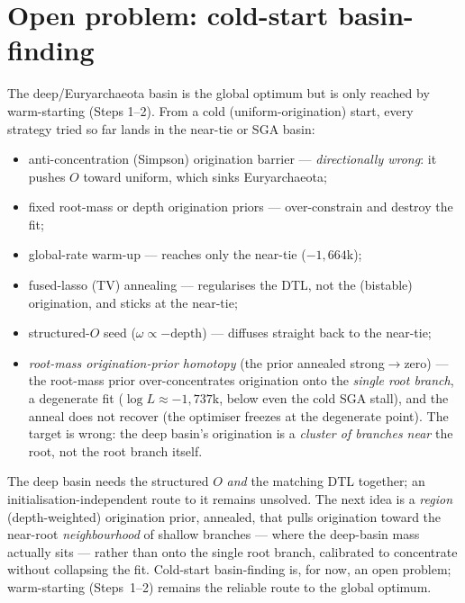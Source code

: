 \documentclass[11pt]{article}
\begin{document}
\section{Open problem: cold-start basin-finding}
\label{sec:cold}
The deep/Euryarchaeota basin is the global optimum but is only reached by warm-starting
(Steps 1--2). From a cold (uniform-origination) start, every strategy tried so far lands in
the near-tie or SGA basin:
\begin{itemize}
  \item anti-concentration (Simpson) origination barrier --- \emph{directionally wrong}: it
    pushes $O$ toward uniform, which sinks Euryarchaeota;
  \item fixed root-mass or depth origination priors --- over-constrain and destroy the fit;
  \item global-rate warm-up --- reaches only the near-tie ($-1{,}664$k);
  \item fused-lasso (TV) annealing --- regularises the DTL, not the (bistable) origination,
    and sticks at the near-tie;
  \item structured-$O$ seed ($\omega\propto-\text{depth}$) --- diffuses straight back to the
    near-tie;
  \item \emph{root-mass origination-prior homotopy} (the prior annealed strong$\to$zero) ---
    the root-mass prior over-concentrates origination onto the \emph{single root branch}, a
    degenerate fit ($\log L\approx-1{,}737$k, below even the cold SGA stall), and the anneal
    does not recover (the optimiser freezes at the degenerate point). The target is wrong:
    the deep basin's origination is a \emph{cluster of branches near} the root, not the root
    branch itself.
\end{itemize}
The deep basin needs the structured $O$ \emph{and} the matching DTL together; an
initialisation-independent route to it remains unsolved. The next idea is a \emph{region}
(depth-weighted) origination prior, annealed, that pulls origination toward the near-root
\emph{neighbourhood} of shallow branches --- where the deep-basin mass actually sits ---
rather than onto the single root branch, calibrated to concentrate without collapsing the
fit. Cold-start basin-finding is, for now, an open problem; warm-starting (Steps~1--2)
remains the reliable route to the global optimum.
\end{document}
